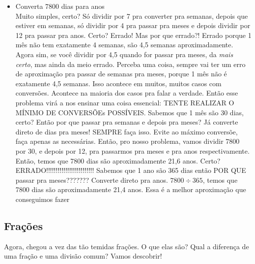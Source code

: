 \documentclass{article}
\begin{document}
\begin{itemize}
    \item Converta 7800 dias para anos \\[5pt] Muito simples, certo? Só dividir por 7 pra converter pra semanas, depois que estiver em semanas, só dividir por 4 pra passar pra meses e depois dividir por 12 pra passar pra anos. Certo? Errado! Mas por que errado?! Errado porque 1 mês não tem exatamente 4 semanas, são 4,5 semanas aproximadamente. Agora sim, se você dividir por 4,5 quando for passar pra meses, da \textit{mais certo}, mas ainda da meio errado. Perceba uma coisa, sempre vai ter um erro de aproximação pra passar de semanas pra meses, porque 1 mês não é exatamente 4,5 semanas. Isso acontece em muitos, muitos casos com conversões. Acontece na maioria dos casos pra falar a verdade. Então esse problema virá a nos ensinar uma coisa essencial: TENTE REALIZAR O MÍNIMO DE CONVERSÕEs POSSÍVEIS. Sabemos que 1 mês são 30 dias, certo? Então por que passar pra semanas e depois pra meses? Já converte direto de dias pra meses! SEMPRE faça isso. Evite ao máximo conversõe, faça apenas as necessárias. Então, pro nosso problema, vamos dividir 7800 por 30, e depois por 12, pra passarmos pra meses e pra anos respectivamente. Então, temos que 7800 dias são aproximadamente 21,6 anos. Certo? ERRADO!!!!!!!!!!!!!!!!!!!!!!!!! Sabemos que 1 ano são 365 dias então POR QUE passar pra meses??????? Converte direto pra anos. $7800\div365$, temos que 7800 dias são aproximadamente 21,4 anos. Essa é a melhor aproximação que conseguimos fazer
    
\end{itemize}

\subsection{Frações}
Agora, chegou a vez das tão temidas frações. O que elas são? Qual a diferença de uma fração e uma divisão comum? Vamos descobrir!
\end{document}
